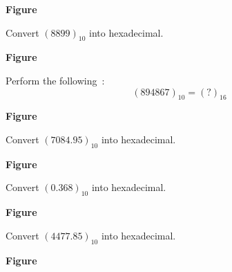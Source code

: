 \begin{solution}
\begin{center}
{\bf Figure}
\end{center}
\end{solution}

\begin{problem}\label{prob5.13}
Convert $(8899)_{10}$ into hexadecimal.
\end{problem}

\begin{solution}
\begin{center}
{\bf Figure}
\end{center}
\end{solution}

\begin{problem}\label{prob5.14}
Perform the following~:
$$
(894867)_{10}=(?)_{16}
$$
\end{problem}

\begin{solution}
\begin{center}
{\bf Figure}
\end{center}
\end{solution}

\begin{problem}\label{prob5.15}
Convert $(7084.95)_{10}$ into hexadecimal.
\end{problem}

\begin{solution}
\begin{center}
{\bf Figure}
\end{center}
\end{solution}

\begin{problem}\label{prob5.16}
Convert $(0.368)_{10}$ into hexadecimal.
\end{problem}

\begin{solution}
\begin{center}
{\bf Figure}
\end{center}
\end{solution}

\begin{problem}\label{prob5.8}
Convert $(4477.85)_{10}$ into hexadecimal.
\end{problem}

\begin{solution}
\begin{center}
{\bf Figure}
\end{center}
\end{solution}

